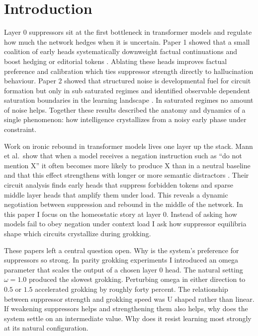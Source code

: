 \section{Introduction}

Layer 0 suppressors sit at the first bottleneck in transformer models and regulate how much the network hedges when it is uncertain. Paper 1 showed that a small coalition of early heads systematically downweight factual continuations and boost hedging or editorial tokens \cite{thompson2025suppressors}. Ablating these heads improves factual preference and calibration which ties suppressor strength directly to hallucination behaviour. Paper 2 showed that structured noise is developmental fuel for circuit formation but only in sub saturated regimes and identified observable dependent saturation boundaries in the learning landscape \cite{thompson2025timescale}. In saturated regimes no amount of noise helps. Together these results described the anatomy and dynamics of a single phenomenon: how intelligence crystallizes from a noisy early phase under constraint.

Work on ironic rebound in transformer models lives one layer up the stack. Mann et al.\ show that when a model receives a negation instruction such as ``do not mention X'' it often becomes more likely to produce X than in a neutral baseline and that this effect strengthens with longer or more semantic distractors \cite{mann2025dontthink}. Their circuit analysis finds early heads that suppress forbidden tokens and sparse middle layer heads that amplify them under load. This reveals a dynamic negotiation between suppression and rebound in the middle of the network. In this paper I focus on the homeostatic story at layer 0. Instead of asking how models fail to obey negation under context load I ask how suppressor equilibria shape which circuits crystallize during grokking.

These papers left a central question open. Why is the system's preference for suppressors so strong. In parity grokking experiments I introduced an omega parameter that scales the output of a chosen layer 0 head. The natural setting $\omega = 1.0$ produced the slowest grokking. Perturbing omega in either direction to $0.5$ or $1.5$ accelerated grokking by roughly forty percent. The relationship between suppressor strength and grokking speed was U shaped rather than linear. If weakening suppressors helps and strengthening them also helps, why does the system settle on an intermediate value. Why does it resist learning most strongly at its natural configuration.

